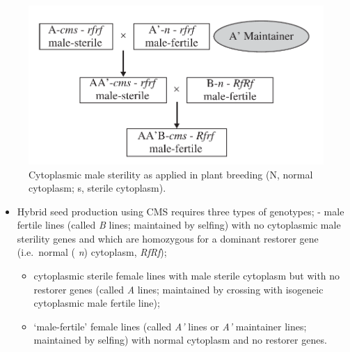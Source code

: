 \documentclass[11pt,ignorenonframetext,aspectratio=169]{beamer}
\providecommand{\tightlist}{%
  \setlength{\itemsep}{0pt}\setlength{\parskip}{0pt}}
\begin{document}
\begin{frame}{}
\protect\hypertarget{section-14}{}
\begin{figure}

{\centering \includegraphics[width=0.5\linewidth]{./images/cms_use} 

}

\caption{Cytoplasmic male sterility as applied in plant breeding (N, normal cytoplasm; s, sterile cytoplasm).}\label{fig:cms-use}
\end{figure}
\end{frame}

\begin{frame}{}
\protect\hypertarget{section-15}{}
\begin{itemize}
\tightlist
\item
  Hybrid seed production using CMS requires three types of genotypes; -
  male fertile lines (called \emph{B} lines; maintained by selfing) with
  no cytoplasmic male sterility genes and which are homozygous for a
  dominant restorer gene (i.e.~normal ( \emph{n}) cytoplasm,
  \emph{RfRf});

  \begin{itemize}
  \tightlist
  \item
    cytoplasmic sterile female lines with male sterile cytoplasm but
    with no restorer genes (called \emph{A} lines; maintained by
    crossing with isogeneic cytoplasmic male fertile line);
  \item
    `male-fertile' female lines (called \emph{A'} lines or \emph{A'}
    maintainer lines; maintained by selfing) with normal cytoplasm and
    no restorer genes.
  \end{itemize}
\end{itemize}
\end{frame}
\end{document}
